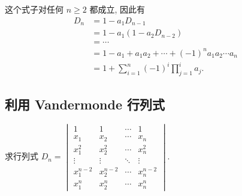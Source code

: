 \begin{solution}
    这个式子对任何 $n \geqslant 2$ 都成立, 因此有
    \begin{align*}
        D_n & =1-a_{1} D_{n-1}                                          \\
            & =1-a_{1}(1-a_{2} D_{n-2})                                 \\
            & =\cdots                                                   \\
            & =1-a_{1}+a_{1} a_{2}+\cdots+(-1)^n a_{1} a_{2} \cdots a_n \\
            & =1+\sum_{i=1}^{n}(-1)^i \prod_{j=1}^i a_j.
    \end{align*}
\end{solution}

\subsection{利用 Vandermonde 行列式}

\begin{example}{}{}
    求行列式 $D_n=\begin{vmatrix}
            1         & 1         & \cdots & 1         \\
            x_1       & x_2       & \cdots & x_n       \\
            x_1^{2}   & x_2^{2}   & \cdots & x_n^{2}   \\
            \vdots    & \vdots    & \ddots & \vdots    \\
            x_1^{n-2} & x_2^{n-2} & \cdots & x_n^{n-2} \\
            x_1^{n}   & x_2^{n}   & \cdots & x_n^{n}
        \end{vmatrix}$.
\end{example}

